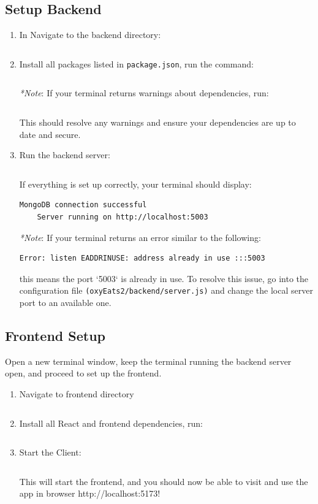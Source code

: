 \documentclass[10pt,twocolumn]{article}
\begin{document}
\subsection{Setup Backend }
\begin{enumerate}
    \item In Navigate to the backend directory:
\begin{lstlisting}[language=bash]
  % cd backend 
\end{lstlisting}
\item Install all packages listed in \texttt{package.json}, run the command:
\begin{lstlisting}[language=bash]
  % npm install
\end{lstlisting} 
\textit{*Note}: If your terminal returns warnings about dependencies, run:
\begin{lstlisting}[language=bash] 
 % npm audit fix
\end{lstlisting}This should resolve any warnings and ensure your dependencies are up to date and secure.

\item Run the backend server:
\begin{lstlisting}[language=bash]
  % npm start
\end{lstlisting}
If everything is set up correctly, your terminal should display:
\begin{lstlisting}[language=bash]
    MongoDB connection successful
    Server running on http://localhost:5003
\end{lstlisting}
\textit{*Note}: If your terminal returns an error similar to the following:  
\begin{lstlisting}[language=bash]
Error: listen EADDRINUSE: address already in use :::5003
\end{lstlisting}  
this means the port `5003` is already in use. To resolve this issue, go into the configuration file \texttt{(oxyEats2/backend/server.js)} and change the local server port to an available one.
\end{enumerate}
\subsection{Frontend Setup}
Open a new terminal window, keep the terminal running the backend server open, and proceed to set up the frontend.
\begin{enumerate}
    \item Navigate to frontend directory
    \begin{lstlisting}[language=bash]
  % cd frontend
\end{lstlisting}
\item Install all React and frontend dependencies, run:
\begin{lstlisting}[language=bash]
  % npm install
\end{lstlisting}
\item Start the Client:
\begin{lstlisting}[language=bash]
  % npm run dev
\end{lstlisting}
This will start the frontend, and you should now be able to visit and use the app in browser http://localhost:5173!


\end{enumerate}
\end{document}
